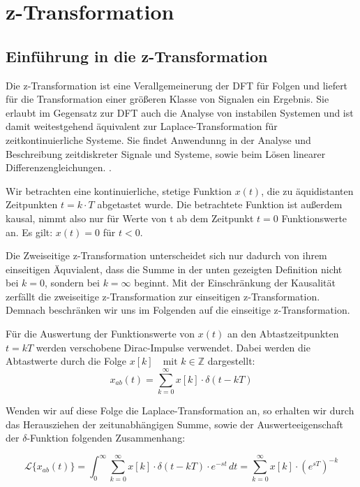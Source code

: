 \section{z-Transformation}
\subsection{Einführung in die z-Transformation}
Die z-Transformation ist eine Verallgemeinerung der DFT für Folgen und liefert für die Transformation einer größeren Klasse von Signalen ein Ergebnis. Sie erlaubt im Gegensatz zur DFT auch die Analyse von instabilen Systemen und ist damit weitestgehend äquivalent zur Laplace-Transformation für zeitkontinuierliche Systeme. Sie findet Anwendunng in der Analyse und Beschreibung zeitdiskreter Signale und Systeme, sowie beim Lösen linearer Differenzengleichungen. \cite[S.231]{book2} \cite[S.179]{book3}. %

Wir betrachten eine kontinuierliche, stetige Funktion $x(t)$, die zu äquidistanten Zeitpunkten $t=k \cdot T$ abgetastet wurde. 
Die betrachtete Funktion ist außerdem kausal, nimmt also nur für Werte von t ab dem Zeitpunkt $t=0$ Funktionswerte an. Es gilt: $x(t) = 0$ für $t<0$. 

Die Zweiseitige z-Transformation unterscheidet sich nur dadurch von ihrem einseitigen Äquvialent, dass die Summe in der unten gezeigten Definition nicht bei $k=0$, sondern bei $k=\infty$ beginnt. Mit der Einschränkung der Kausalität zerfällt die zweiseitige z-Transformation zur einseitigen z-Transformation. Demnach beschränken wir uns im Folgenden auf die einseitige z-Transformation.

Für die Auswertung der Funktionswerte von $x(t)$ an den Abtastzeitpunkten $t=kT$ werden verschobene Dirac-Impulse verwendet. Dabei werden die Abtastwerte durch die Folge $x[k]\quad\text{mit } k \in \mathbb{Z}$ dargestellt:
\begin{equation}
    x_{ab}(t) = \sum_{k=0}^{\infty} x[k] \cdot \delta(t-kT) 
    \label{eq:abgetastete_funktion}
\end{equation}

Wenden wir auf diese Folge die Laplace-Transformation an, so erhalten wir durch das Herausziehen der zeitunabhängigen Summe, sowie der Auswerteeigenschaft der $\delta$-Funktion folgenden Zusammenhang:


\begin{equation}
    \mathcal{L}\{x_{ab}(t)\} = \int_{0}^{\infty} \sum_{k=0}^{\infty} x[k] \cdot \delta(t-kT)\cdot e^{-s t}\,dt = \sum_{k=0}^{\infty} x[k] \cdot (e^{s T})^{-k}
    \label{eq:Laplace_Transformation_abgetastete_funktion}
\end{equation}

